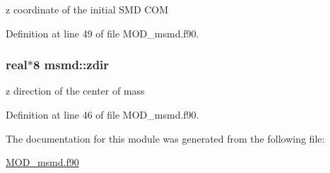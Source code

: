 z coordinate of the initial S\-M\-D C\-O\-M 



Definition at line 49 of file M\-O\-D\-\_\-msmd.\-f90.

\hypertarget{classmsmd_a03065d009523da9f2881234a34921999}{
\subsubsection[{zdir}]{\setlength{\rightskip}{0pt plus 5cm}real$\ast$8 msmd\-::zdir}}\label{classmsmd_a03065d009523da9f2881234a34921999}


z direction of the center of mass 



Definition at line 46 of file M\-O\-D\-\_\-msmd.\-f90.



The documentation for this module was generated from the following file\-:\begin{DoxyCompactItemize}
\item 
\hyperlink{MOD__msmd_8f90}{M\-O\-D\-\_\-msmd.\-f90}\end{DoxyCompactItemize}
